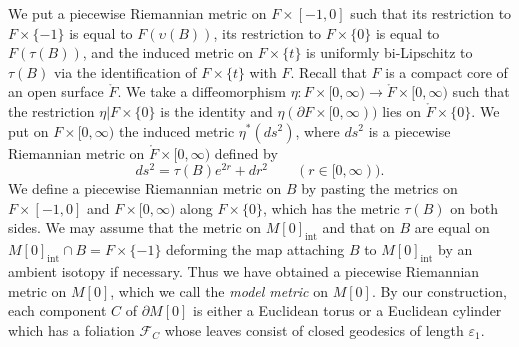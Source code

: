\documentclass{amsart}
\theoremstyle{definition}
\numberwithin{figure}{section}
\numberwithin{equation}{section}
\def\cf{\mathcal{F}}
\def\part{\partial}
\def\ve{\varepsilon}
\def\ve{\varepsilon}
\begin{document}
We put  a piecewise Riemannian metric on $F \times [-1,0]$ such 
that  its restriction to $F\times \{-1\}$ is equal to $F(\upsilon(B))$, its restriction to $F\times \{0\}$ 
is equal to $F(\tau(B))$, and the induced metric on $F \times \{t\}$ is uniformly bi-Lipschitz to $\tau(B)$ via the identification of $F \times \{t\}$ with $F$.
Recall that $F$ is a compact core of an open surface $\mathring F$.
We take a diffeomorphism $\eta:F\times [0,\infty)\rightarrow \mathring F\times [0,\infty)$ such that 
the restriction $\eta|F\times \{0\}$ is the identity and $\eta(\partial F \times [0,\infty))$ lies on $\mathring F \times \{0\}$.
We put on $F\times [0,\infty)$  the induced metric $\eta^*(ds^2)$, where $ds^2$ is a 
piecewise Riemannian metric on $\mathring F\times [0,\infty)$ defined by 
$$
ds^2=\tau(B) e^{2r}+dr^2\qquad (r\in [0,\infty)).
$$
We define a piecewise Riemannian metric on $B$ by pasting the metrics on $F \times [-1,0]$ and $F \times [0,\infty)$ along $F \times \{0\}$, which has the metric $\tau(B)$ on both sides.
We may assume that the metric on $M[0]_{\mathrm{int}}$ and that on $B$ are equal on $M[0]_{\mathrm{int}}\cap B=F\times \{-1\}$ 
 deforming the map attaching $B$ to $M[0]_{\mathrm{int}}$ by an ambient isotopy if necessary.
Thus we have obtained a piecewise Riemannian metric on $M[0]$, which we call the {\em model metric} on $M[0]$.
By our construction, each component $C$ of $\part M[0]$ is either a Euclidean torus or a Euclidean cylinder which 
has a foliation $\cf_C$ whose leaves consist of closed geodesics  of length $\ve_1$. 
\end{document}

